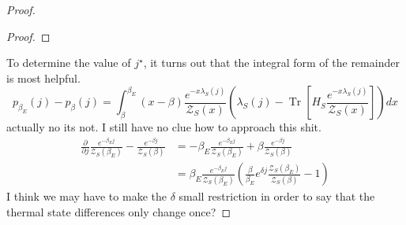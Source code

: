 \documentclass{article}
\newcommand{\parens}[1]{\left( #1 \right)}
\newcommand{\brackets}[1]{\left[ #1 \right]}
\DeclareMathOperator{\Tr}{Tr}
\newcommand{\trace}[1]{\Tr \brackets{ #1 }}
\newcommand{\partfun}{\mathcal{Z}}
\begin{document}
\begin{proof}
\begin{proof}
 \end{proof}

To determine the value of $j^\star$, it turns out that the integral form of the remainder is most helpful.
$$p_{\beta_E}(j) - p_{\beta}(j) = \int_{\beta}^{\beta_E} (x - \beta) \frac{e^{-x \lambda_S(j)}}{\partfun_S(x)} \parens{\lambda_S(j) - \trace{H_S \frac{e^{-x \lambda_S(j)}}{\partfun_S(x)}}} dx$$
actually no its not. I still have no clue how to approach this shit. 
\begin{align}
    \frac{\partial}{\partial j} \frac{e^{-\beta_E j}}{\partfun_S(\beta_E)} - \frac{e^{-\beta j }}{\partfun_S(\beta)} &= -\beta_E \frac{e^{-\beta_E j}}{\partfun_S(\beta_E)} + \beta \frac{e^{-\beta j }}{\partfun_S(\beta)} \\
    &= \beta_E \frac{e^{-\beta_E j}}{\partfun_S(\beta_E)} \left( \frac{\beta}{\beta_E} e^{\delta j} \frac{\partfun_S(\beta_E)}{\partfun_S(\beta)} - 1 \right)
\end{align}
I think we may have to make the $\delta$ small restriction in order to say that the thermal state differences only change once? 


\end{proof}
\end{document}
